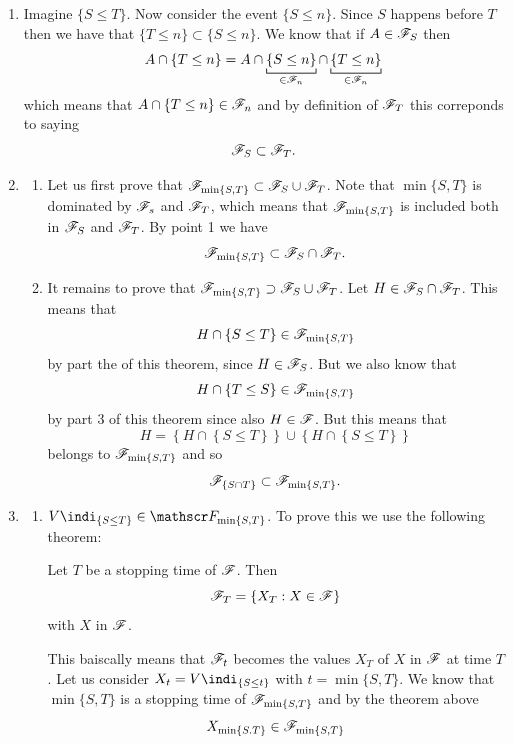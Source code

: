 \documentclass{report}
\begin{document}
\begin{fancyproof}
	\begin{enumerate}
		\item Imagine $\{S\leq T\}$. Now consider the event $\{S\leq n\}$. Since $S$ happens before $T$ then we have that $\{T\leq n\}\subset\{S\leq n\}$. We know that if $A\in\mathscr{F}_S$ then
		\[A\cap\{T\leq n\}=A\cap\underbracket[0.6pt]{\{S\leq n\}}_{\in\F_n}\cap\underbracket[0.6pt]{\{T\leq n\}}_{\in\F_n}\]
		which means that $A\cap\{T\leq n\}\in\mathscr{F}_n$ and by definition of $\mathscr{F}_T$
		this correponds to saying
		\[\mathscr{F}_S\subset\mathscr{F}_T.\]
		\item \begin{enumerate}
			\item Let us first prove that $\mathscr{F}_{\min\{S,T\}}\subset\mathscr{F}_{S}\cup\mathscr{F}_T$.
			Note that $\min\{S,T\}$ is dominated by $\mathscr{F}_s$ and $\mathscr{F}_T$, which means that $\mathscr{F}_{\min\{S,T\}}$ is included both in $\mathscr{F}_S$ and $\mathscr{F}_T$. By point 1 we have
			\[\mathscr{F}_{\min\{S,T\}}\subset\mathscr{F}_S\cap\mathscr{F}_T.\]
			\item It remains to prove that $\mathscr{F}_{\min\{S,T\}}\supset\mathscr{F}_{S}\cup\mathscr{F}_T$. Let $H\in\mathscr{F}_S\cap\mathscr{F}_T$. This means that 
			\begin{equation*}
				H\cap\{S\leq T\}\in\mathscr{F}_{\min\{S,T\}}
			\end{equation*}
			by part the of this theorem, since $H\in\mathscr{F}_S$. But we also know that
			\[H\cap\{T\leq S\}\in\mathscr{F}_{\min\{S,T\}}\]
			by part 3 of this theorem since also $H\in\mathscr{F}$. But this means that
			\begin{equation*}
				H=\left\{H\cap\left\{S\leq T\right\}\right\}\cup\left\{H\cap\left\{S\leq T\right\}\right\}
			\end{equation*}
			belongs to $\mathscr{F}_{\min\{S,T\}}$ and so
			\[\mathscr{F}_{\{S\cap T\}}\subset\mathscr{F}_{\min\{S,T\}}.\]
		\end{enumerate}
		\item\begin{enumerate}
			\item $V\indi_{\{S\leq T\}}\in\F_{\min\{S,T\}}$. To prove this we use the following theorem:
			\begin{theorem}
				Let $T$ be a stopping time of $\mathscr{F}$. Then
				\[\mathscr{F}_T=\{X_T:X\in\mathscr{F}\}\]
				with $X$ in $\mathscr{F}$.
			\end{theorem}
			This baiscally means that $\mathscr{F}_t$ becomes the values $X_T$ of $X$ in $\mathscr{F}$ at time $T$. Let us consider $X_t=V\indi_{\{S\leq t\}}$ with $t=\min\{S,T\}$. We know that $\min\{S,T\}$ is a stopping time of $\mathscr{F}_{\min\{S,T\}}$ and by the theorem above
			\[X_{\min\{S.T\}}\in\mathscr{F}_{\min\{S,T\}}\]

\end{enumerate}
\end{enumerate}
\end{fancyproof}
\end{document}

